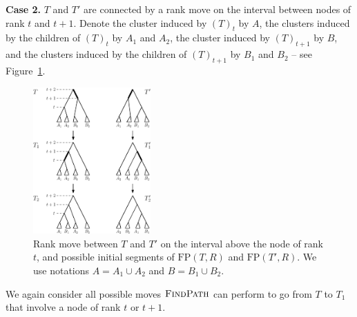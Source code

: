 \documentclass[11pt]{amsart}
\newcommand{\findpath}{\textsc{FindPath}}
\newcommand{\fp}{\mathrm{FP}}
\begin{document}
\textbf{Case 2.}
$T$ and $T'$ are connected by a rank move on the interval between nodes of rank $t$ and $t+1$.
Denote the cluster induced by $(T)_t$ by $A$, the clusters induced by the children of $(T)_t$ by $A_1$ and $A_2$, the cluster induced by $(T)_{t+1}$ by $B$, and the clusters induced by the children of $(T)_{t+1}$ by $B_1$ and $B_2$ -- see Figure~\ref{fig:thm_fp_rank1}.

\begin{figure}[ht]
\centering
\includegraphics[width=0.4\textwidth]{thm_fp_rank1}
\caption{Rank move between $T$ and $T'$ on the interval above the node of rank $t$, and possible initial segments of $\fp(T, R)$ and $\fp(T', R)$.
We use notations $A = A_1 \cup A_2$ and $B = B_1 \cup B_2$.}
\label{fig:thm_fp_rank1}
\end{figure}

We again consider all possible moves $\findpath$ can perform to go from $T$ to $T_1$ that involve a node of rank $t$ or $t+1$.
\end{document}
